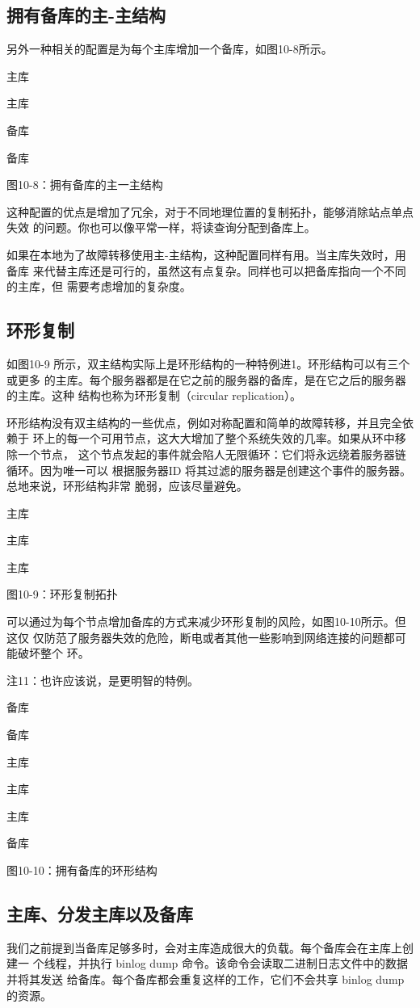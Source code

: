 \subsection{拥有备库的主-主结构}
另外一种相关的配置是为每个主库增加一个备库，如图10-8所示。

主库

主库

备库

备库

图10-8：拥有备库的主一主结构

这种配置的优点是增加了冗余，对于不同地理位置的复制拓扑，能够消除站点单点失效
的问题。你也可以像平常一样，将读查询分配到备库上。

如果在本地为了故障转移使用主-主结构，这种配置同样有用。当主库失效时，用备库
来代替主库还是可行的，虽然这有点复杂。同样也可以把备库指向一个不同的主库，但
需要考虑增加的复杂度。

\subsection{环形复制}
如图10-9 所示，双主结构实际上是环形结构的一种特例进1。环形结构可以有三个或更多
的主库。每个服务器都是在它之前的服务器的备库，是在它之后的服务器的主库。这种
结构也称为环形复制（circular replication）。

环形结构没有双主结构的一些优点，例如对称配置和简单的故障转移，并且完全依赖于
环上的每一个可用节点，这大大增加了整个系统失效的几率。如果从环中移除一个节点，
这个节点发起的事件就会陷人无限循环：它们将永远绕着服务器链循环。因为唯一可以
根据服务器ID 将其过滤的服务器是创建这个事件的服务器。总地来说，环形结构非常
脆弱，应该尽量避免。

主库

主库

主库

图10-9：环形复制拓扑

可以通过为每个节点增加备库的方式来减少环形复制的风险，如图10-10所示。但这仅
仅防范了服务器失效的危险，断电或者其他一些影响到网络连接的问题都可能破坏整个
环。

注11：也许应该说，是更明智的特例。

备库

备库

主库

主库

主库

备库

图10-10：拥有备库的环形结构

\subsection{主库、分发主库以及备库}
我们之前提到当备库足够多时，会对主库造成很大的负载。每个备库会在主库上创建一
个线程，并执行 binlog dump 命令。该命令会读取二进制日志文件中的数据并将其发送
给备库。每个备库都会重复这样的工作，它们不会共享 binlog dump 的资源。

